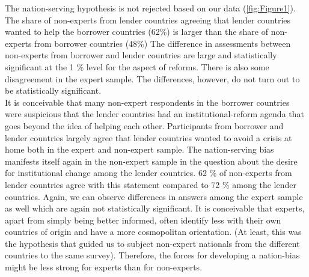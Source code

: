 The nation-serving hypothesis is not rejected based on our data (\autoref{fig:Figure1}). The share of non-experts from lender countries agreeing that lender countries wanted to help the borrower countries (62\%) is larger than the share of non-experts from borrower countries (48\%)
The difference in assessments between
non-experts from borrower and lender countries are large and statistically
significant at the 1 \% level for the aspect of reforms. There is also some disagreement in the expert sample. The differences, however, do not turn out to be statistically significant. \\
It is conceivable that
many non-expert respondents in the borrower countries were suspicious that
the lender countries had an institutional-reform agenda that goes beyond the
idea of helping each other. Participants from borrower and lender countries largely agree that lender countries wanted to avoid a crisis at home both in the expert and non-expert sample. The nation-serving bias manifests itself again in the non-expert sample in the question about the desire for institutional change among the lender countries. 62 \% of non-experts from lender countries agree with this statement compared to 72 \% among the lender countries. Again, we can observe differences in answers among the expert sample as well which are again not statistically significant. 
It is conceivable that experts, apart from simply being
better informed, often identify less with their own countries of origin and have 
a more cosmopolitan orientation. (At
least, this was the hypothesis that guided us to subject non-expert
nationals from the different countries to the same survey). Therefore, the
forces for developing a nation-bias might be less strong for experts than for non-experts. 

